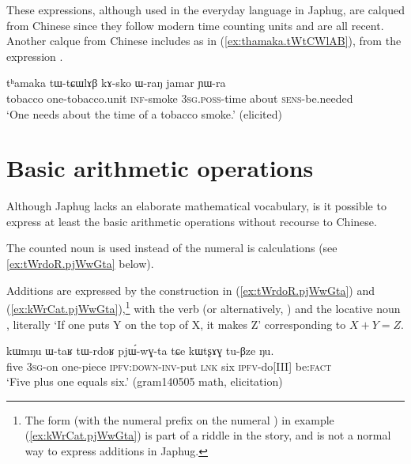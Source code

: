 These expressions, although used in the everyday language in Japhug, are calqued from Chinese since they follow modern time counting units and are all recent. Another calque from Chinese includes  as in  (\ref{ex:thamaka.tWtCWlAB}), from the expression .
 

\begin{exe}
\ex \label{ex:thamaka.tWtCWlAB}
\gll    tʰamaka tɯ-tɕɯlɤβ kɤ-sko ɯ-raŋ jamar ɲɯ-ra \\
tobacco  one-tobacco.unit \textsc{inf}-smoke \textsc{3sg}.\textsc{poss}-time about \textsc{sens}-be.needed \\
\glt `One needs about the time of a tobacco smoke.' (elicited)
\end{exe}
    
\section{Basic arithmetic operations} \label{sec:arithmetic}

Although Japhug lacks an elaborate mathematical vocabulary, is it possible to express at least the basic arithmetic operations without recourse to Chinese. 

The counted noun  is used instead of the numeral  is calculations (see \ref{ex:tWrdoR.pjWwGta} below).

Additions are expressed by the construction in (\ref{ex:tWrdoR.pjWwGta}) and (\ref{ex:kWrCat.pjWwGta}),\footnote{The form  (with the numeral prefix  on the numeral ) in example (\ref{ex:kWrCat.pjWwGta}) is part of a riddle in the story, and is not a normal way to express additions in Japhug. } with the verb  (or alternatively, ) and the locative noun , literally  `If one puts Y on the top of X, it makes Z' corresponding to $X+Y=Z$.  

\begin{exe}
\ex \label{ex:tWrdoR.pjWwGta}
\gll kɯmŋu ɯ-taʁ tɯ-rdoʁ pjɯ́-wɣ-ta tɕe kɯtʂɤɣ tu-βze ŋu.  \\
 five \textsc{3sg}-on one-piece \textsc{ipfv}:\textsc{down}-\textsc{inv}-put \textsc{lnk} six \textsc{ipfv}-do[III] be:\textsc{fact} \\
\glt `Five plus one equals six.' (gram140505 math, elicitation)
\end{exe}

